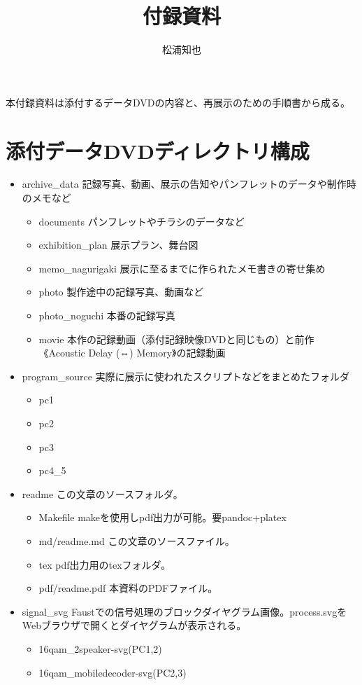 \documentclass[a4paper]{jsarticle}
\title{付録資料}
\author{松浦知也}
\begin{document}
\maketitle

本付録資料は添付するデータDVDの内容と、再展示のための手順書から成る。

\section{添付データDVDディレクトリ構成}\label{ux6dfbux4ed8ux30c7ux30fcux30bfdvdux30c7ux30a3ux30ecux30afux30c8ux30eaux69cbux6210}

\begin{itemize}
\tightlist
\item
  archive\_data
  記録写真、動画、展示の告知やパンフレットのデータや制作時のメモなど

  \begin{itemize}
  \tightlist
  \item
    documents パンフレットやチラシのデータなど
  \item
    exhibition\_plan 展示プラン、舞台図
  \item
    memo\_nagurigaki 展示に至るまでに作られたメモ書きの寄せ集め
  \item
    photo 製作途中の記録写真、動画など
  \item
    photo\_noguchi 本番の記録写真
  \item
    movie 本作の記録動画（添付記録映像DVDと同じもの）と前作《Acoustic
    Delay (⇔) Memory》の記録動画
  \end{itemize}
\item
  program\_source 実際に展示に使われたスクリプトなどをまとめたフォルダ

  \begin{itemize}
  \tightlist
  \item
    pc1
  \item
    pc2
  \item
    pc3
  \item
    pc4\_5
  \end{itemize}
\item
  readme この文章のソースフォルダ。

  \begin{itemize}
  \tightlist
  \item
    Makefile makeを使用しpdf出力が可能。要pandoc+platex
  \item
    md/readme.md この文章のソースファイル。
  \item
    tex pdf出力用のtexフォルダ。
  \item
    pdf/readme.pdf 本資料のPDFファイル。
  \end{itemize}
\item
  signal\_svg
  Faustでの信号処理のブロックダイヤグラム画像。process.svgをWebブラウザで開くとダイヤグラムが表示される。

  \begin{itemize}
  \tightlist
  \item
    16qam\_2speaker-svg(PC1,2)
  \item
    16qam\_mobiledecoder-svg(PC2,3)
  \end{itemize}
\end{itemize}
\end{document}
